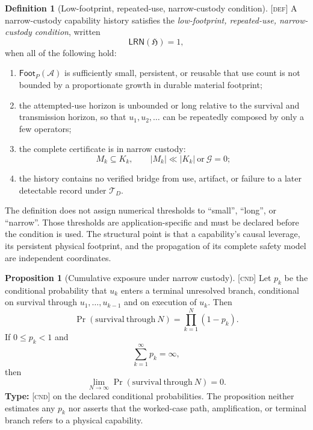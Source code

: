 \documentclass[11pt]{article}
\newcommand{\Defn}{\textsc{[def]}}
\newcommand{\Cnd}{\textsc{[cnd]}}
\theoremstyle{definition}
\newtheorem{sdefinition}{Definition}
\newtheorem{sproposition}{Proposition}
\begin{document}
\begin{sdefinition}[Low-footprint, repeated-use, narrow-custody condition]
\label{def:low-footprint-condition}
\Defn{} A narrow-custody capability history satisfies the \emph{low-footprint,
repeated-use, narrow-custody condition}, written
\begin{equation}
\mathsf{LRN}(\mathfrak H)=1,
\label{eq:lrn-condition}
\end{equation}
when all of the following hold:
\begin{enumerate}
\item $\mathsf{Foot}_P(\mathcal A)$ is sufficiently small, persistent, or
reusable that use count is not bounded by a proportionate growth in durable
material footprint;

\item the attempted-use horizon is unbounded or long relative to the survival
and transmission horizon, so that $u_1,u_2,\ldots$ can be repeatedly composed by
only a few operators;

\item the complete certificate is in narrow custody:
\begin{equation}
M_k\subseteq K_k,
\qquad
|M_k|\ll |K_k|\ \text{or}\ \mathcal G=0;
\label{eq:narrow-certificate-custody}
\end{equation}

\item the history contains no verified bridge from use, artifact, or failure to a
later detectable record under $\mathcal T_D$.
\end{enumerate}

The definition does not assign numerical thresholds to ``small'', ``long'', or
``narrow''. Those thresholds are application-specific and must be declared before
the condition is used. The structural point is that a capability's causal leverage,
its persistent physical footprint, and the propagation of its complete safety model
are independent coordinates.
\end{sdefinition}

\begin{sproposition}[Cumulative exposure under narrow custody]
\label{prop:cumulative-exposure}
\Cnd{} Let $p_k$ be the conditional probability that $u_k$ enters a terminal
unresolved branch, conditional on survival through $u_1,\ldots,u_{k-1}$ and on
execution of $u_k$. Then
\begin{equation}
\Pr(\mathrm{survival\ through\ }N)=
\prod_{k=1}^{N}(1-p_k).
\label{eq:conditional-cumulative-survival}
\end{equation}
If $0\leq p_k<1$ and
\begin{equation}
\sum_{k=1}^{\infty}p_k=\infty,
\label{eq:divergent-conditional-risk}
\end{equation}
then
\begin{equation}
\lim_{N\to\infty}
\Pr(\mathrm{survival\ through\ }N)=0.
\label{eq:zero-asymptotic-survival}
\end{equation}
\textbf{Type:} \Cnd{} on the declared conditional probabilities. The proposition
neither estimates any $p_k$ nor asserts that the worked-case path, amplification,
or terminal branch refers to a physical capability.
\end{sproposition}
\end{document}
